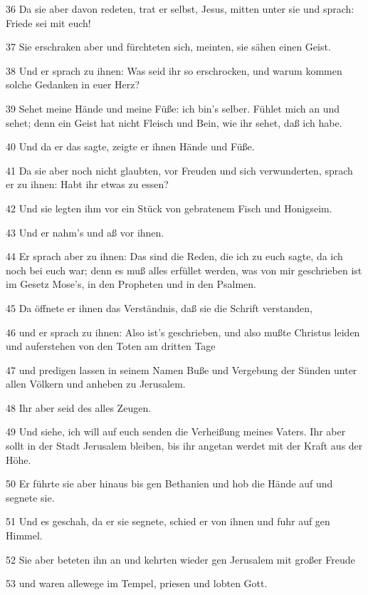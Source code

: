 \par 36 Da sie aber davon redeten, trat er selbst, Jesus, mitten unter sie und sprach: Friede sei mit euch!
\par 37 Sie erschraken aber und fürchteten sich, meinten, sie sähen einen Geist.
\par 38 Und er sprach zu ihnen: Was seid ihr so erschrocken, und warum kommen solche Gedanken in euer Herz?
\par 39 Sehet meine Hände und meine Füße: ich bin's selber. Fühlet mich an und sehet; denn ein Geist hat nicht Fleisch und Bein, wie ihr sehet, daß ich habe.
\par 40 Und da er das sagte, zeigte er ihnen Hände und Füße.
\par 41 Da sie aber noch nicht glaubten, vor Freuden und sich verwunderten, sprach er zu ihnen: Habt ihr etwas zu essen?
\par 42 Und sie legten ihm vor ein Stück von gebratenem Fisch und Honigseim.
\par 43 Und er nahm's und aß vor ihnen.
\par 44 Er sprach aber zu ihnen: Das sind die Reden, die ich zu euch sagte, da ich noch bei euch war; denn es muß alles erfüllet werden, was von mir geschrieben ist im Gesetz Mose's, in den Propheten und in den Psalmen.
\par 45 Da öffnete er ihnen das Verständnis, daß sie die Schrift verstanden,
\par 46 und er sprach zu ihnen: Also ist's geschrieben, und also mußte Christus leiden und auferstehen von den Toten am dritten Tage
\par 47 und predigen lassen in seinem Namen Buße und Vergebung der Sünden unter allen Völkern und anheben zu Jerusalem.
\par 48 Ihr aber seid des alles Zeugen.
\par 49 Und siehe, ich will auf euch senden die Verheißung meines Vaters. Ihr aber sollt in der Stadt Jerusalem bleiben, bis ihr angetan werdet mit der Kraft aus der Höhe.
\par 50 Er führte sie aber hinaus bis gen Bethanien und hob die Hände auf und segnete sie.
\par 51 Und es geschah, da er sie segnete, schied er von ihnen und fuhr auf gen Himmel.
\par 52 Sie aber beteten ihn an und kehrten wieder gen Jerusalem mit großer Freude
\par 53 und waren allewege im Tempel, priesen und lobten Gott.

